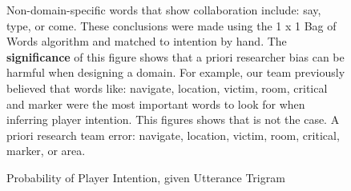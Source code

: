 \begin{figure}[h!]
    \centering
    \caption{Non-domain-specific words that show collaboration include: say, type, or come. These conclusions were made using the 1 x 1 Bag of Words algorithm and matched to intention by hand. The \textbf{significance} of this figure shows that a priori researcher bias can be harmful when designing a domain. For example, our team previously believed that words like: navigate, location, victim, room, critical and marker were the most important words to look for when inferring player intention. This figures shows that is not the case. A priori research team error: navigate, location, victim, room, critical, marker, or area.}
    \end{figure}
    
\begin{figure}[h!]
    \centering    
    \caption{Probability of Player Intention, given Utterance Trigram}
\end{figure}

